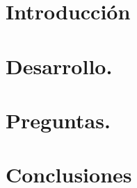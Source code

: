 \documentclass[11pt,letterpaper]{article}
\begin{document}


\tableofcontents

\section{Introducción}




\section{Desarrollo.}


\section{Preguntas.}


\section{Conclusiones}





\printbibliography
\end{document}
